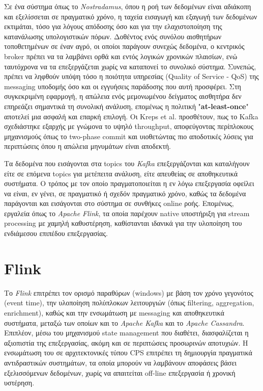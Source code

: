 Σε ένα σύστημα όπως το \textit{Nostradamus}, όπου η ροή των δεδομένων είναι
αδιάκοπη και εξελίσσεται σε πραγματικό χρόνο, η ταχεία εισαγωγή και εξαγωγή των
δεδομένων εκτιμάται, τόσο για λόγους απόδοσης όσο και για την ελαχιστοποίηση
της κατανάλωσης υπολογιστικών πόρων. Δοθέντος ενός συνόλου αισθητήρων
τοποθετημένων σε έναν αγρό, οι οποίοι παράγουν συνεχώς δεδομένα, ο κεντρικός
broker πρέπει να τα λαμβάνει ορθά και εντός λογικών χρονικών πλαισίων, ενώ
ταυτόχρονα να τα επεξεργάζεται χωρίς να καταπονεί το συνολικό σύστημα. Συνεπώς,
πρέπει να ληφθούν υπόψη τόσο η ποιότητα υπηρεσίας (Quality of Service - QoS)
της messaging υποδομής όσο και οι εγγυήσεις παράδοσης που αυτή προσφέρει. Στη
συγκεκριμένη εφαρμογή, η απώλεια ενός μεμονωμένου δείγματος αισθητήρα δεν
επηρεάζει σημαντικά τη συνολική ανάλυση, επομένως η πολιτική
"\textbf{at-least-once}" αποτελεί μια ασφαλή και επαρκή επιλογή. Οι Kreps et
al. \cite{kafkaoriginal} προσθέτουν, πως το Kafka σχεδιάστηκε εξαρχής με
γνώμονα το υψηλό throughput, αποφεύγοντας περίπλοκους μηχανισμούς όπως το
two-phase commit και υιοθετώντας πιο αποδοτικές λύσεις για περιπτώσεις όπου η
απώλεια μηνυμάτων είναι αποδεκτή.

Τα δεδομένα που εισάγονται στα topics του \textit{Kafka} επεξεργάζονται και
καταλήγουν είτε σε επόμενα topics για μετέπειτα ανάλυση, είτε απευθείας σε
αποθηκευτικά συστήματα. Ο τρόπος με τον οποίο πραγματοποιείται η εν λόγω
επεξεργασία οφείλει να είναι, εν γένει, σε πραγματικό ή σχεδόν πραγματικό
χρόνο, καθώς τα δεδομένα παράγονται και εισάγονται στο σύστημα σε συνθήκες
online ροής. Επομένως, εργαλεία όπως το \textit{Apache Flink}, τα οποία
παρέχουν native υποστήριξη για stream processing με χαμηλή καθυστέρηση,
καθίστανται ιδανικά για την υλοποίηση του ενδιάμεσου επιπέδου επεξεργασίας.

\section{Flink}

Το \textit{Flink} επιτρέπει τον ορισμό παραθύρων (windows) με βάση τον χρόνο
γεγονότος (event time), την υλοποίηση πολύπλοκων λειτουργιών (όπως filtering,
aggregation, enrichment), καθώς και την ενσωμάτωση με messaging και
αποθηκευτικά συστήματα, μεταξώ των οποίων και το \textit{Apache Kafka} και το
\textit{Apache Cassandra}. Επιπλέον, μέσω του μηχανισμού state management που
διαθέτει, διασφαλίζεται η αξιοπιστία της επεξεργασίας, ακόμη και σε περιπτώσεις
προσωρινών αποτυχιών. Η ενσωμάτωση του σε αρχιτεκτονικές τύπου CPS επιτρέπει τη
δημιουργία πραγματικά αντιδραστικών συστημάτων, τα οποία μπορούν να λαμβάνουν
αποφάσεις βάσει εξελισσόμενων δεδομένων, χωρίς να απαιτείται off-line
επεξεργασία ή χρονική υστέρηση.

